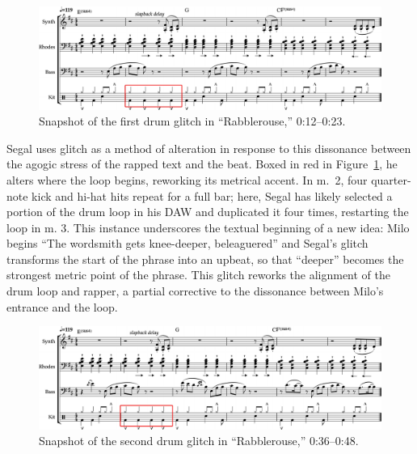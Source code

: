     \begin{figure}[ht]
        \centering
        \includegraphics[width=\textwidth]{images/figures/chp 02/012023rabblefirstglitch.pdf}
        \caption{Snapshot of the first drum glitch in ``Rabblerouse,'' 0:12--0:23.}
        \label{fig:rabblefirstglitch}
    \end{figure}

Segal uses glitch as a method of alteration in response to this dissonance between the agogic
stress of the rapped text and the beat. Boxed in red in Figure~\ref{fig:rabblefirstglitch}, 
he alters where the loop begins, reworking its metrical accent. In m.~2, four quarter-note
kick and hi-hat hits repeat for a full bar; here, Segal has likely selected a portion of the drum
loop in his DAW and duplicated it four times, restarting the loop in m. 3. This instance underscores
the textual beginning of a new idea: Milo begins ``The wordsmith gets knee-deeper, beleaguered'' and
Segal's glitch transforms the start of the phrase into an upbeat, so that ``deeper'' becomes the 
strongest metric point of the phrase. This glitch reworks the alignment of the drum loop and rapper,
a partial corrective to the dissonance between Milo's entrance and the loop.

    \begin{figure}[ht]
        \centering
        \includegraphics[width=\textwidth]{images/figures/chp 02/036048rabblesecondglitch.pdf}
        \caption{Snapshot of the second drum glitch in ``Rabblerouse,'' 0:36--0:48.}
        \label{fig:rabblesecondglitch}
    \end{figure}

